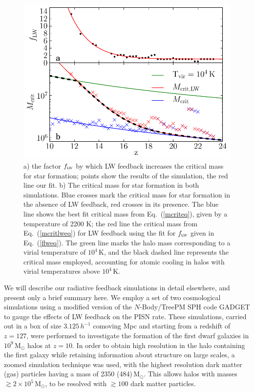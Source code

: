 \documentclass{thesis}
\newcommand{\msun}{\ensuremath{\,\mathrm{M}_{\odot}}\xspace}
\newcommand{\RefEq}[1]{\mbox{Eq.~(\ref{#1})}}
\begin{document}
\begin{figure}
 \begin{center}
   \includegraphics[width=\columnwidth]{lwFeedback}
   \caption{a) the factor $f_{\textsc{lw}}$ by which
     LW feedback increases the critical mass for star formation;
     points show the results of the simulation, the red line our fit.
     b) The critical mass for star formation in both simulations.
     Blue crosses mark the critical mass for star formation in the
     absence of LW feedback, red crosses in its presence.  The blue
     line shows the best fit critical mass from \RefEq{mcriteq}, given
     by a temperature of 2200 K; the red line the critical mass from
     \RefEq{mcritlweq} for LW feedback using the fit for
     $f_{\textsc{lw}}$ given in \RefEq{flweq}.  The green line marks
     the halo mass corresponding to a virial temperature of $10^4\,$K,
     and the black dashed line represents the critical mass employed,
     accounting for atomic cooling in halos with virial temperatures
     above $10^4\,$K.}
   \label{lwFeedback}
 \end{center}
\end{figure}

We will describe our radiative feedback simulations in detail
elsewhere, and present only a brief summary here.  We employ a set of
two cosmological simulations using a modified version of the
$N$-Body/TreePM SPH code GADGET \citep{Springel2005,Springeletal2001}
to gauge the effects of LW feedback on the PISN rate. These
simulations, carried out in a box of size $3.125 \,h^{-1}$ comoving
Mpc and starting from a redshift of $z=127$, were performed to
investigate the formation of the first dwarf galaxies in $10^9$\msun
halos at $z=10$. In order to obtain high resolution in the halo
containing the first galaxy while retaining information about
structure on large scales, a zoomed simulation technique was used,
with the highest resolution dark matter (gas) particles having a mass
of 2350 (484)\msun. This allows halos with masses $\gtrsim 2
\times 10^5$\msun, to be resolved with $\gtrsim 100$ dark
matter particles.
\end{document}
